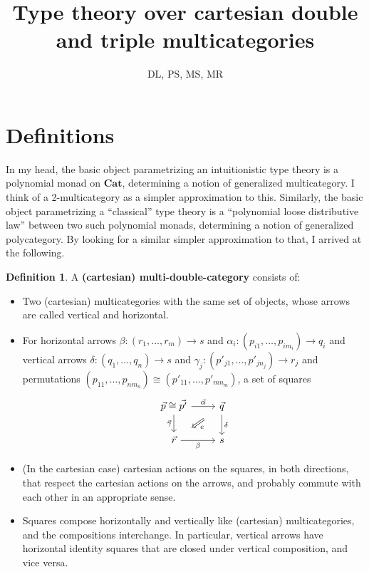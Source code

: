 \documentclass{article}
\title{Type theory over cartesian double and triple multicategories}
\author{DL, PS, MS, MR}
\theoremstyle{definition}
\newtheorem{defn}{Definition}
\def\twocell#1#2#3{\ar[from=#1,to=#2,phantom,""{name=1,near start},""{name=2,near end}]\ar[Rightarrow,from=1,to=2,"#3"]}
\def\drtwocell{\twocell{r}{d}}
\begin{document}
\maketitle

\section{Definitions}
\label{sec:definitions}

In my head, the basic object parametrizing an intuitionistic type theory is a polynomial monad on $\mathbf{Cat}$, determining a notion of generalized multicategory.
I think of a 2-multicategory as a simpler approximation to this.
Similarly, the basic object parametrizing a ``classical'' type theory is a ``polynomial loose distributive law'' between two such polynomial monads, determining a notion of generalized polycategory.
By looking for a similar simpler approximation to that, I arrived at the following.

\begin{defn}
  A \textbf{(cartesian) multi-double-category} consists of:
  \begin{itemize}
  \item Two (cartesian) multicategories with the same set of objects, whose arrows are called vertical and horizontal.
  \item For horizontal arrows $\beta:(r_1,\dots,r_m)\to s$ and $\alpha_i:(p_{i1},\dots,p_{im_i})\to q_i$ and vertical arrows $\delta:(q_1,\dots,q_n) \to s$ and $\gamma_j:(p'_{j1},\dots,p'_{j n_j})\to r_j$ and permutations $(p_{11},\dots,p_{nm_n})\cong (p'_{11},\dots,p'_{mn_m})$, a set of squares
    \[\begin{tikzcd}
      \vec{p}\cong\vec{p'} \ar[r,"\vec{\alpha}"] \ar[d,swap,"\vec{\gamma}"]\drtwocell{e}
      & \vec{q} \ar[d,"\delta"]
      \\ \vec{r} \ar[r,swap,"\beta"] & s
    \end{tikzcd}\]
  \item (In the cartesian case) cartesian actions on the squares, in both directions, that respect the cartesian actions on the arrows, and probably commute with each other in an appropriate sense.
  \item Squares compose horizontally and vertically like (cartesian) multicategories, and the compositions interchange.
    In particular, vertical arrows have horizontal identity squares that are closed under vertical composition, and vice versa.
  \end{itemize}
\end{defn}
\end{document}
